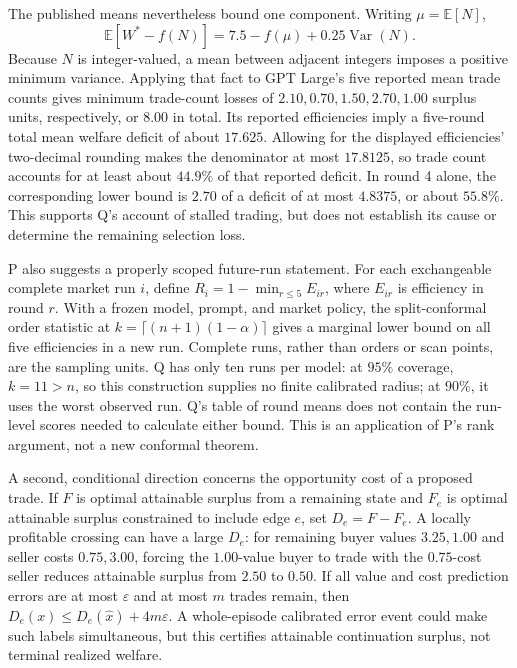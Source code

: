 \documentclass{article}
\begin{document}
The published means nevertheless bound one component. Writing \(\mu=\mathbb E[N]\),
\[
 \mathbb E[W^*-f(N)]
 =
 7.5-f(\mu)+0.25\operatorname{Var}(N).
\]
Because \(N\) is integer-valued, a mean between adjacent integers imposes a positive minimum variance. Applying that fact to GPT Large's five reported mean trade counts gives minimum trade-count losses of \(2.10,0.70,1.50,2.70,1.00\) surplus units, respectively, or \(8.00\) in total. Its reported efficiencies imply a five-round total mean welfare deficit of about \(17.625\). Allowing for the displayed efficiencies' two-decimal rounding makes the denominator at most \(17.8125\), so trade count accounts for at least about \(44.9\%\) of that reported deficit. In round 4 alone, the corresponding lower bound is \(2.70\) of a deficit of at most \(4.8375\), or about \(55.8\%\). This supports Q's account of stalled trading, but does not establish its cause or determine the remaining selection loss. 

P also suggests a properly scoped future-run statement. For each exchangeable complete market run \(i\), define \(R_i=1-\min_{r\leq5}E_{ir}\), where \(E_{ir}\) is efficiency in round \(r\). With a frozen model, prompt, and market policy, the split-conformal order statistic at \(k=\lceil(n+1)(1-\alpha)\rceil\) gives a marginal lower bound on all five efficiencies in a new run. Complete runs, rather than orders or scan points, are the sampling units. Q has only ten runs per model: at \(95\%\) coverage, \(k=11>n\), so this construction supplies no finite calibrated radius; at \(90\%\), it uses the worst observed run. Q's table of round means does not contain the run-level scores needed to calculate either bound. This is an application of P's rank argument, not a new conformal theorem. 

A second, conditional direction concerns the opportunity cost of a proposed trade. If \(F\) is optimal attainable surplus from a remaining state and \(F_e\) is optimal attainable surplus constrained to include edge \(e\), set \(D_e=F-F_e\). A locally profitable crossing can have a large \(D_e\): for remaining buyer values \(3.25,1.00\) and seller costs \(0.75,3.00\), forcing the \(1.00\)-value buyer to trade with the \(0.75\)-cost seller reduces attainable surplus from \(2.50\) to \(0.50\). If all value and cost prediction errors are at most \(\varepsilon\) and at most \(m\) trades remain, then \(D_e(x)\leq D_e(\widehat x)+4m\varepsilon\). A whole-episode calibrated error event could make such labels simultaneous, but this certifies attainable continuation surplus, not terminal realized welfare. 
\end{document}
